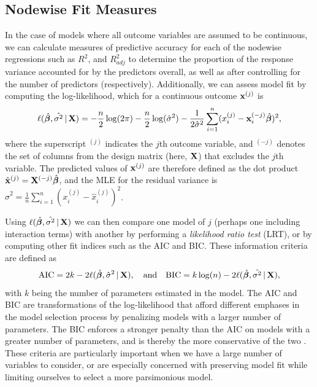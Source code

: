 \subsection{Nodewise Fit Measures}
In the case of models where all outcome variables are assumed to be continuous, we can calculate measures of predictive accuracy for each of the nodewise regressions such as $R^2$, and $R_{adj}^2$ to determine the proportion of the response variance accounted for by the predictors overall, as well as after controlling for the number of predictors (respectively). Additionally, we can assess model fit by computing the log-likelihood, which for a continuous outcome $\mathbf{x}^{(j)}$ is
\begin{equation}
    \ell(\hat{\bm{\beta}},\hat{\sigma^2}\,|\,\mathbf{X}) = -\frac{n}{2}\log(2\pi) - \frac{n}{2}\log(\hat{\sigma}^2) - \frac{1}{2\hat{\sigma}^2}\sum_{i=1}^n (x_i^{(j)} - \mathbf{x}_i^{(-j)}\hat{\bm{\beta}})^2,
\end{equation}
where the superscript $^{(j)}$ indicates the $j$th outcome variable, and $^{(-j)}$ denotes the set of columns from the design matrix (here, $\mathbf{X}$) that excludes the $j$th variable. The predicted values of $\mathbf{x}^{(j)}$ are therefore defined as the dot product $\hat{\mathbf{x}}^{(j)} = \mathbf{X}^{(-j)}\hat{\bm{\beta}}$, and the MLE for the residual variance is $\hat{\sigma}^2 = \frac{1}{n}\sum_{i=1}^n (x_i^{(j)} - \hat{x}_i^{(j)})^2$. 

Using $\ell(\hat{\bm{\beta}},\hat{\sigma^2}\,|\,\mathbf{X})$ we can then compare one model of $j$ (perhaps one including interaction terms) with another by performing a \textit{likelihood ratio test} (LRT), or by computing other fit indices such as the AIC and BIC. These information criteria are defined as
\begin{equation}
    \text{AIC} = 2k - 2\ell(\hat{\bm{\beta}},\hat{\sigma}^2\,|\,\mathbf{X}),\quad\text{and}\quad\text{BIC} = k\log(n) - 2\ell(\hat{\bm{\beta}},\hat{\sigma^2}\,|\,\mathbf{X}),
\end{equation}
with $k$ being the number of parameters estimated in the model. The AIC and BIC are transformations of the log-likelihood that afford different emphases in the model selection process by penalizing models with a larger number of parameters. The BIC enforces a stronger penalty than the AIC on models with a greater number of parameters, and is thereby the more conservative of the two \cite{yang2005can}. These criteria are particularly important when we have a large number of variables to consider, or are especially concerned with preserving model fit while limiting ourselves to select a more parsimonious model. 

